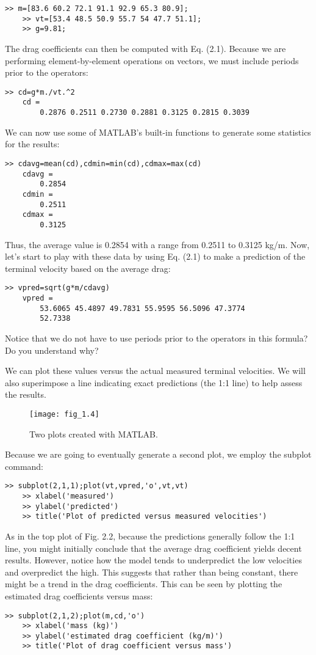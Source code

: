 \documentclass[../main.tex]{subfiles}
\begin{document}
\begin{lstlisting}[frame=none, numbers=none]
	>> m=[83.6 60.2 72.1 91.1 92.9 65.3 80.9];
	>> vt=[53.4 48.5 50.9 55.7 54 47.7 51.1];
	>> g=9.81;
\end{lstlisting}

The drag coefficients can then be computed with Eq. (2.1). Because we are performing
element-by-element operations on vectors, we must include periods prior to the operators:
\begin{lstlisting}[frame=none, numbers=none]
	>> cd=g*m./vt.^2
	cd =
		0.2876 0.2511 0.2730 0.2881 0.3125 0.2815 0.3039
\end{lstlisting}
We can now use some of MATLAB’s built-in functions to generate some statistics for the
results:
\begin{lstlisting}[frame=none, numbers=none]
	>> cdavg=mean(cd),cdmin=min(cd),cdmax=max(cd)
	cdavg =
		0.2854
	cdmin =
		0.2511
	cdmax =
		0.3125
\end{lstlisting}
Thus, the average value is 0.2854 with a range from 0.2511 to 0.3125 kg/m.
Now, let’s start to play with these data by using Eq. (2.1) to make a prediction of the
terminal velocity based on the average drag:
\begin{lstlisting}[frame=none, numbers=none]
	>> vpred=sqrt(g*m/cdavg)
	vpred =
		53.6065 45.4897 49.7831 55.9595 56.5096 47.3774
		52.7338
\end{lstlisting}
Notice that we do not have to use periods prior to the operators in this formula? Do you
understand why?


We can plot these values versus the actual measured terminal velocities. We will also
superimpose a line indicating exact predictions (the 1:1 line) to help assess the results.


\begin{figure}[H]
	\centering
	\texttt{[image: fig\_1.4]}
   \caption{\textsf{Two plots created with MATLAB.}}
   \label{fig_2.2}
\end{figure}


Because we are going to eventually generate a second plot, we employ the subplot
command:
\begin{lstlisting}[frame=none, numbers=none]
	>> subplot(2,1,1);plot(vt,vpred,'o',vt,vt)
	>> xlabel('measured')
	>> ylabel('predicted')
	>> title('Plot of predicted versus measured velocities')
\end{lstlisting}


As in the top plot of Fig. 2.2, because the predictions generally follow the 1:1 line, you
might initially conclude that the average drag coefficient yields decent results. However,
notice how the model tends to underpredict the low velocities and overpredict the high.
This suggests that rather than being constant, there might be a trend in the drag coefficients.
This can be seen by plotting the estimated drag coefficients versus mass:
\begin{lstlisting}[frame=none, numbers=none]
	>> subplot(2,1,2);plot(m,cd,'o')
	>> xlabel('mass (kg)')
	>> ylabel('estimated drag coefficient (kg/m)')
	>> title('Plot of drag coefficient versus mass')
\end{lstlisting}
\end{document}
